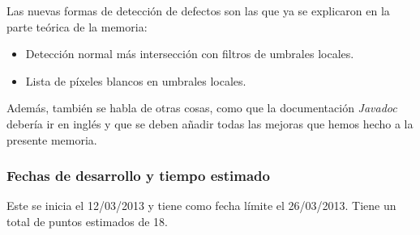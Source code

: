 Las nuevas formas de detección de defectos son las que ya se explicaron en la parte teórica de la memoria:

\begin{itemize}
\item Detección normal más intersección con filtros de umbrales locales.
\item Lista de píxeles blancos en umbrales locales.
\end{itemize}

Además, también se habla de otras cosas, como que la documentación \textit{Javadoc} debería ir en inglés y que se deben añadir todas las mejoras que hemos hecho a la presente memoria.

\subsubsection*{Fechas de desarrollo y tiempo estimado}
Este \sprint{} se inicia el 12/03/2013 y tiene como fecha límite el 26/03/2013. Tiene un total de puntos estimados de 18.

